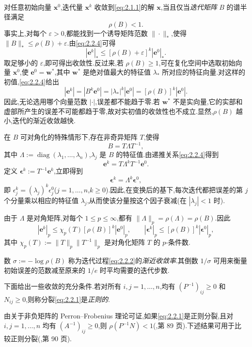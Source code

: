 对任意初始向量 \(\boldsymbol{x}^0\),迭代量 \(\boldsymbol{x}^k\) 收敛到\eqref{eq:2.1.1}的解 \(\boldsymbol{x}\),当且仅当\emph{迭代矩阵} \(B\) 的谱半径满足
\begin{equation}\label{eq:2.2.5}
  \rho(B)<1.
\end{equation}
事实上,对每个 \(\varepsilon>0\),都能找到一个诱导矩阵范数 \(\|\cdot\|_*\),使得 \(\|B\|_*\le\rho(B)+\varepsilon\).由\eqref{eq:2.2.4}可得
\[
  |\boldsymbol{e}^k|_*\le[\rho(B)+\varepsilon]^k|\boldsymbol{e}^0|_*.
\]
取足够小的 \(\varepsilon\),即可得出收敛性.反过来,若 \(\rho(B)\ge1\),可在复化空间中选取初始向量 \(\boldsymbol{x}^0\),使 \(\boldsymbol{e}^0=\boldsymbol{w}^*\),其中 \(\boldsymbol{w}^*\) 是绝对值最大的特征值 \(\lambda_*\) 所对应的特征向量.对这样的初值,\eqref{eq:2.2.4}给出
\[
  |\boldsymbol{e}^k|=|B^k\boldsymbol{e}^0|=|\lambda_*|^k|\boldsymbol{e}^0|
    =[\rho(B)]^k|\boldsymbol{e}^0|.
\]
因此,无论选用哪个向量范数 \(|\cdot|\),误差都不能趋于零.若 \(\boldsymbol{w}^*\) 不是实向量,它的实部和虚部所产生的误差不可能都趋于零,故对实初值的收敛性也不成立.显然,\(\rho(B)\) 越小,迭代的渐近收敛越快.

在 \(B\) 可对角化的特殊情形下,存在非奇异矩阵 \(T\),使得
\[
  B=T\Lambda T^{-1},
\]
其中 \(\Lambda:=\operatorname{diag}(\lambda_1,\ldots,\lambda_n)\),\(\lambda_j\) 是 \(B\) 的特征值.由递推关系\eqref{eq:2.2.4}得到
\[
  \boldsymbol{e}^k=T\Lambda^kT^{-1}\boldsymbol{e}^0.
\]
定义 \(\boldsymbol{\epsilon}^k:=T^{-1}\boldsymbol{e}^k\),立即得到
\[
  \boldsymbol{\epsilon}^k=\Lambda^k\boldsymbol{\epsilon}^0,
\]
即 \(\epsilon^k_j=(\lambda_j)^k\epsilon^0_j\)(\(j=1,\ldots,n\),\(k\ge0\)).因此,在变换后的基下,每次迭代都把误差的第 \(j\) 个分量乘以相应的特征值 \(\lambda_j\),从而使该分量按这个因子衰减(在 \(|\lambda_j|<1\) 时).

由于 \(\Lambda\) 是对角矩阵,对每个 \(1\le p\le\infty\),都有 \(\|\Lambda\|_p=\rho(\Lambda)=\rho(B)\).因此
\[
  |\boldsymbol{e}^k|_p\le\chi_p(T)[\rho(B)]^k|\boldsymbol{e}^0|_p,
  \qquad
  |\boldsymbol{\epsilon}^k|_p\le[\rho(B)]^k|\boldsymbol{\epsilon}^0|_p,
\]
其中 \(\chi_p(T):=\|T\|_p\|T^{-1}\|_p\) 是对角化矩阵 \(T\) 的 \(p\)-条件数.

数 \(\sigma:=-\log\rho(B)\) 称为迭代过程\eqref{eq:2.2.2}的\emph{渐近收敛率}.其倒数 \(1/\sigma\) 可用来衡量初始误差的范数减至原来的 \(1/e\) 时平均需要的迭代步数.

下面给出一些收敛的充分条件.若对所有 \(i,j=1,\ldots,n\),均有 \((P^{-1})_{ij}\ge0\) 和 \(N_{ij}\ge0\),则称分裂\eqref{eq:2.2.1}是\emph{正则的}.

由关于非负矩阵的 Perron--Frobenius 理论可证,如果\eqref{eq:2.2.1}是正则分裂,且对 \(i,j=1,\ldots,n\) 均有 \((A^{-1})_{ij}\ge0\),则 \(\rho(P^{-1}N)<1\)(,第 89 页).下述结果可用于比较正则分裂(,第 90 页).

